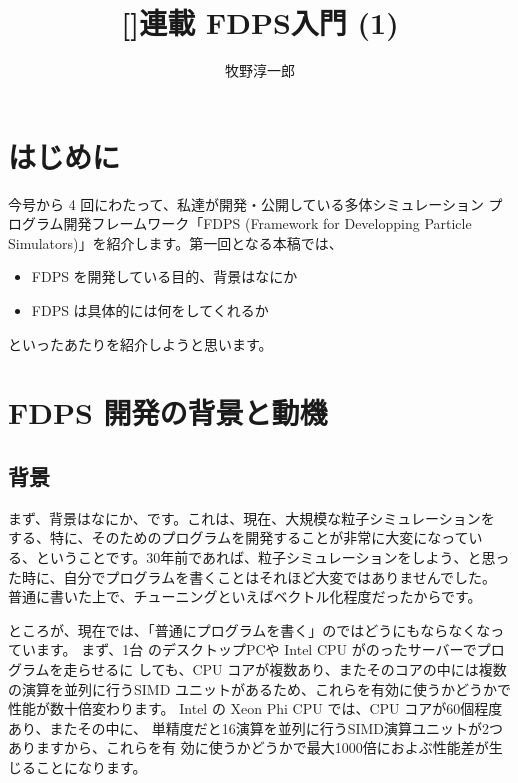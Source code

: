 \documentclass[twocolumn,10pt]{jarticle}
\title{%
[]連載 FDPS入門 (1) 
}
\author{%
牧野淳一郎
}
\affiliation{%
神戸大学\quad 理学研究科/理研 計算科学研究機構
}
\begin{document}
\maketitle

\section{はじめに}

今号から 4 回にわたって、私達が開発・公開している多体シミュレーション
プログラム開発フレームワーク「FDPS (Framework for Developping Particle
  Simulators)」\cite{FDPS}を紹介します。第一回となる本稿では、
\begin{itemize}
\item FDPS を開発している目的、背景はなにか
\item FDPS は具体的には何をしてくれるか
\end{itemize}  
といったあたりを紹介しようと思います。
\\

\section{FDPS 開発の背景と動機}

\subsection{背景}

まず、背景はなにか、です。これは、現在、大規模な粒子シミュレーションを
する、特に、そのためのプログラムを開発することが非常に大変になってい
る、ということです。30年前であれば、粒子シミュレーションをしよう、と思っ
た時に、自分でプログラムを書くことはそれほど大変ではありませんでした。
普通に書いた上で、チューニングといえばベクトル化程度だったからです。

ところが、現在では、「普通にプログラムを書く」のではどうにもならなくなっ
ています。
まず、1台
のデスクトップPCや Intel CPU がのったサーバーでプログラムを走らせるに
しても、CPU コアが複数あり、またそのコアの中には複数の演算を並列に行うSIMD
ユニットがあるため、これらを有効に使うかどうかで性能が数十倍変わります。
Intel の Xeon Phi CPU では、CPU コアが60個程度あり、またその中に、
単精度だと16演算を並列に行うSIMD演算ユニットが2つありますから、これらを有
効に使うかどうかで最大1000倍におよぶ性能差が生じることになります。
\end{document}

